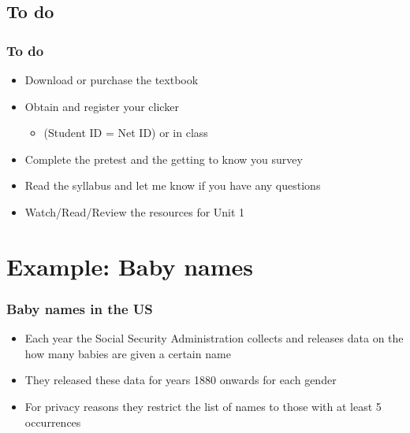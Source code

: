 \documentclass[slidestop,compress,mathserif,12pt,t,professionalfonts,xcolor=table]{beamer}
\begin{document}

\subsection{To do}


\begin{frame}
\frametitle{To do}

\begin{itemize}

\item Download or purchase the textbook

\item Obtain and register your clicker
\begin{itemize}
\item {} (Student ID = Net ID) or in 
class
\end{itemize}

\item Complete the pretest and the getting to know you survey

\item Read the syllabus and let me know if you have any questions

\item Watch/Read/Review the resources for Unit 1

\end{itemize}

\end{frame}


\section{Example: Baby names}


\begin{frame}
\frametitle{Baby names in the US}

\begin{itemize}

\item Each year the Social Security Administration collects and releases data on the 
how many babies are given a certain name

\item They released these data for years 1880 onwards for each gender

\item For privacy reasons they restrict the list of names to those with at least 5 
occurrences

\end{itemize}

\end{frame}
\end{document}
